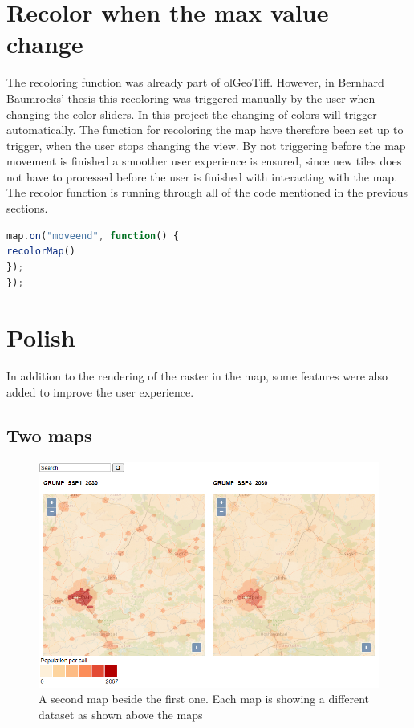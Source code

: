 \section{Recolor when the max value change}

The recoloring function was already part of olGeoTiff. However, in Bernhard Baumrocks’ thesis this recoloring was triggered manually by the user when changing the color sliders. In this project the changing of colors will trigger automatically. The function for recoloring the map have therefore been set up to trigger, when the user stops changing the view. By not triggering before the map movement is finished a smoother user experience is ensured, since new tiles does not have to processed before the user is finished with interacting with the map. The recolor function is running through all of the code mentioned in the previous sections. 

\begin{lstlisting}[language=JavaScript, caption={The JavaScript in the project}, label= VoresJS,escapechar=|]
map.on("moveend", function() {
recolorMap()
});
});
\end{lstlisting}
\section{Polish}
In addition to the rendering of the raster in the map, some features were also added to improve the user experience.

\subsection{Two maps}\label{DTTwoMaps}

\begin{figure} [H]
	\centering
	\includegraphics[width=.8\textwidth]{Pictures/Frontpage}
	\caption{A second map beside the first one. Each map is showing a different dataset as shown above the maps}
	\label{DualMaps}
\end{figure}


